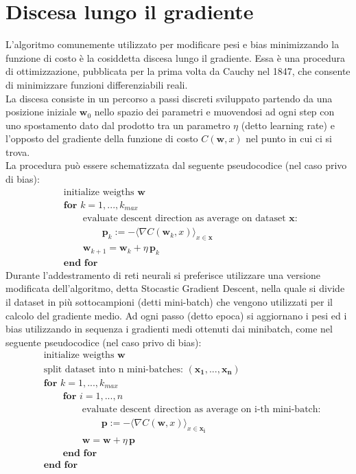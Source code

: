 \documentclass[Lau, noexaminfo, oneside]{sapthesis} %
\begin{document}
\section{Discesa lungo il gradiente}
L'algoritmo comunemente utilizzato per modificare pesi e bias minimizzando la funzione di costo è la cosiddetta discesa lungo il gradiente. Essa è una procedura di ottimizzazione, pubblicata per la prima volta da Cauchy nel 1847, che consente di minimizzare funzioni differenziabili reali. \\
La discesa consiste in un percorso a passi discreti sviluppato partendo da una posizione iniziale $\mathbf{w}_0$ nello spazio dei parametri e muovendosi ad ogni step con uno spostamento dato dal prodotto tra un parametro $\eta$ (detto learning rate) e l'opposto del gradiente della funzione di costo $C(\mathbf{w}, x)$ nel punto in cui ci si trova.\\
La procedura può essere schematizzata dal seguente pseudocodice (nel caso privo di bias):
\begin{align*}
& \text{initialize weigths } \mathbf{w}\\
& \textbf{for } k = 1,..., k_{max} \\
&\qquad \text{evaluate descent direction as average on dataset }\mathbf{x}\text{: } \\
& \qquad  \qquad \mathbf {p} _{k}:=- \langle \nabla C(\mathbf {w} _{k}, x) \rangle_{x \in \mathbf{x}}\\
&\qquad \mathbf {w} _{k+1}=\mathbf {w} _{k}+ \eta \, \mathbf {p} _{k}\\
&\textbf{end for}
\end{align*}
Durante l'addestramento di reti neurali si preferisce utilizzare una versione modificata dell'algoritmo, detta Stocastic Gradient Descent, nella quale si divide il dataset in più sottocampioni (detti mini-batch) che vengono utilizzati per il calcolo del gradiente medio. Ad ogni passo (detto epoca) si aggiornano i pesi ed i bias utilizzando in sequenza i gradienti medi ottenuti dai minibatch, come nel seguente pseudocodice (nel caso privo di bias):
\begin{align*}
& \text{initialize weigths } \mathbf{w}\\
& \text{split dataset into n mini-batches: }(\mathbf{x_1}, ..., \mathbf{x_n})\\
& \textbf{for } k = 1,..., k_{max} \\
& \qquad \textbf{for } i = 1,..., n \\
&\qquad \qquad {\text{evaluate descent direction as average on i-th mini-batch:}}\\
& \qquad \qquad \qquad \mathbf {p}:=- \langle \nabla C(\mathbf {w}, x)\rangle_{x \in \mathbf{x_i}} \\
&\qquad \qquad \mathbf {w}=\mathbf {w} + \eta \, \mathbf {p}\\
&\qquad \textbf{end for} \\
&\textbf{end for}
\end{align*} 
\end{document}
